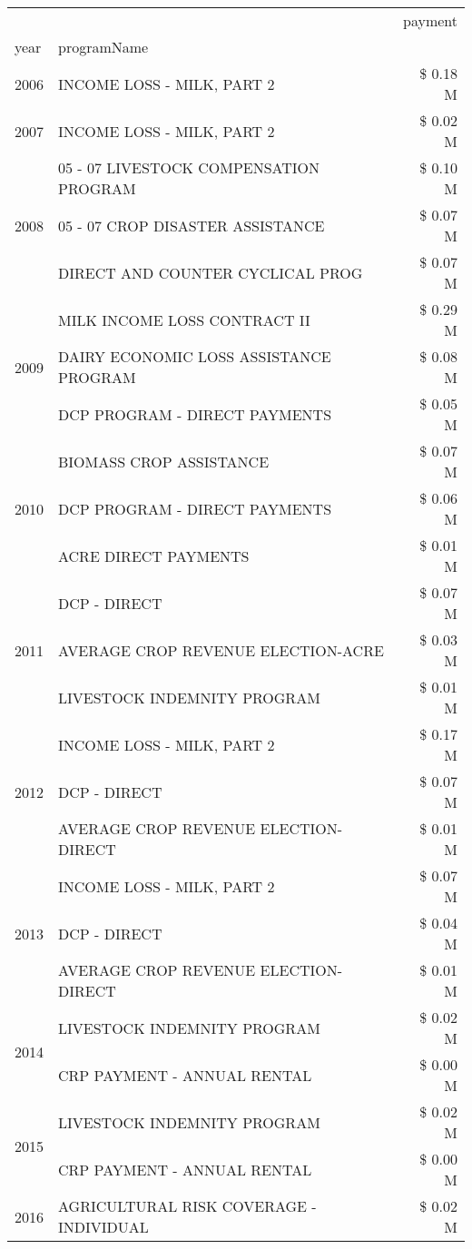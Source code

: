 \begin{tabular}{llr}
\toprule
 &  & payment \\
year & programName &  \\
\midrule
2006 & INCOME LOSS - MILK, PART 2 & \$ 0.18 M \\
\cline{1-3}
2007 & INCOME LOSS - MILK, PART 2 & \$ 0.02 M \\
\cline{1-3}
\multirow[t]{3}{*}{2008} & 05 - 07 LIVESTOCK COMPENSATION PROGRAM & \$ 0.10 M \\
 & 05 - 07 CROP DISASTER ASSISTANCE & \$ 0.07 M \\
 & DIRECT AND COUNTER CYCLICAL PROG & \$ 0.07 M \\
\cline{1-3}
\multirow[t]{3}{*}{2009} & MILK INCOME LOSS CONTRACT II & \$ 0.29 M \\
 & DAIRY ECONOMIC LOSS ASSISTANCE PROGRAM & \$ 0.08 M \\
 & DCP PROGRAM - DIRECT PAYMENTS & \$ 0.05 M \\
\cline{1-3}
\multirow[t]{3}{*}{2010} & BIOMASS CROP ASSISTANCE & \$ 0.07 M \\
 & DCP PROGRAM - DIRECT PAYMENTS & \$ 0.06 M \\
 & ACRE DIRECT PAYMENTS & \$ 0.01 M \\
\cline{1-3}
\multirow[t]{3}{*}{2011} & DCP - DIRECT & \$ 0.07 M \\
 & AVERAGE CROP REVENUE ELECTION-ACRE & \$ 0.03 M \\
 & LIVESTOCK INDEMNITY PROGRAM & \$ 0.01 M \\
\cline{1-3}
\multirow[t]{3}{*}{2012} & INCOME LOSS - MILK, PART 2 & \$ 0.17 M \\
 & DCP - DIRECT & \$ 0.07 M \\
 & AVERAGE CROP REVENUE ELECTION-DIRECT & \$ 0.01 M \\
\cline{1-3}
\multirow[t]{3}{*}{2013} & INCOME LOSS - MILK, PART 2 & \$ 0.07 M \\
 & DCP - DIRECT & \$ 0.04 M \\
 & AVERAGE CROP REVENUE ELECTION-DIRECT & \$ 0.01 M \\
\cline{1-3}
\multirow[t]{2}{*}{2014} & LIVESTOCK INDEMNITY PROGRAM & \$ 0.02 M \\
 & CRP PAYMENT - ANNUAL RENTAL & \$ 0.00 M \\
\cline{1-3}
\multirow[t]{2}{*}{2015} & LIVESTOCK INDEMNITY PROGRAM & \$ 0.02 M \\
 & CRP PAYMENT - ANNUAL RENTAL & \$ 0.00 M \\
\cline{1-3}
\multirow[t]{3}{*}{2016} & AGRICULTURAL RISK COVERAGE - INDIVIDUAL & \$ 0.02 M \\

\end{tabular}
